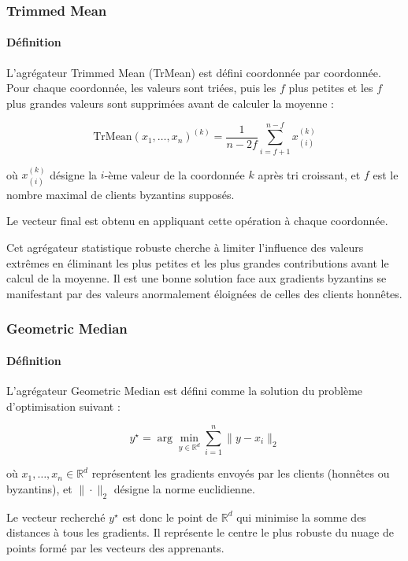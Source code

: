 \documentclass[a4paper,11pt]{article}
\begin{document}
\subsubsection{Trimmed Mean}

\paragraph{Définition}
L'agrégateur Trimmed Mean (TrMean) est défini coordonnée par coordonnée. Pour chaque coordonnée, les valeurs sont triées, puis les $f$ plus petites et les $f$ plus grandes valeurs sont supprimées avant de calculer la moyenne :

\[
\mathrm{TrMean}(x_1,\dots,x_n)^{(k)}
=
\frac{1}{n-2f}
\sum_{i=f+1}^{n-f}
x_{(i)}^{(k)}
\]

où $x_{(i)}^{(k)}$ désigne la $i$-ème valeur de la coordonnée $k$ après tri croissant, et $f$ est le nombre maximal de clients byzantins supposés.

Le vecteur final est obtenu en appliquant cette opération à chaque coordonnée.

Cet agrégateur statistique robuste cherche à limiter l'influence des valeurs extrêmes en éliminant les plus petites et les plus grandes contributions avant le calcul de la moyenne. Il est une bonne solution face aux gradients byzantins se manifestant par des valeurs anormalement éloignées de celles des clients honnêtes.

\subsubsection{Geometric Median}

\paragraph{Définition}

L'agrégateur Geometric Median est défini comme la solution du problème d'optimisation suivant :

\[
y^\star
=
\arg\min_{y\in\mathbb{R}^d}
\sum_{i=1}^{n}
\|y-x_i\|_2
\]

où $x_1,\dots,x_n \in \mathbb{R}^d$ représentent les gradients envoyés par les clients (honnêtes ou byzantins), et $\|\cdot\|_2$ désigne la norme euclidienne.

Le vecteur recherché $y^\star$ est donc le point de $\mathbb{R}^d$ qui minimise la somme des distances à tous les gradients. Il représente le centre le plus robuste du nuage de points formé par les vecteurs des apprenants.
\end{document}
